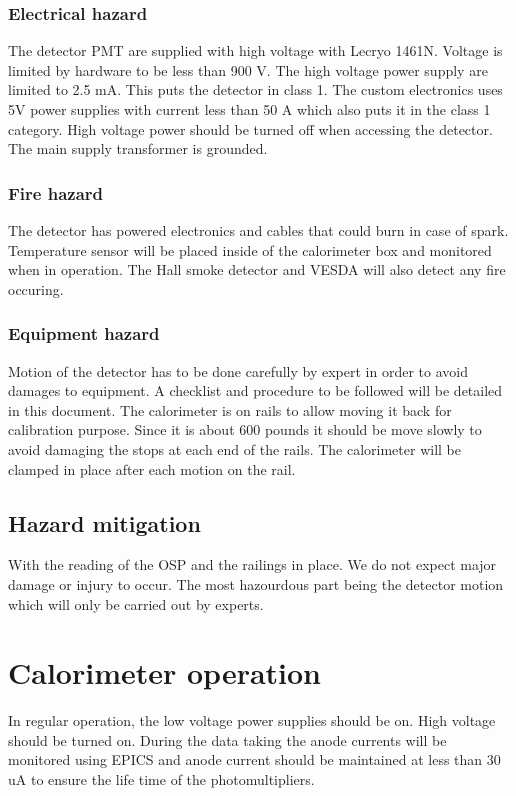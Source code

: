 \documentclass{article}
\begin{document}
\subsubsection{Electrical hazard}
The detector PMT are supplied with high voltage with Lecryo 1461N. Voltage is limited by hardware to be less than 900 V. The high voltage power supply are limited to 2.5 mA. This puts the detector in class 1.
The custom electronics uses 5V power supplies with current less than 50 A which also puts it in the class 1 category. 
High voltage power should be turned off when accessing the detector.
The main supply transformer is grounded.

\subsubsection{Fire hazard}
The detector has powered electronics and cables that could burn in case of spark.
Temperature sensor will be placed inside of the calorimeter box and monitored when in operation. The Hall smoke detector and VESDA will also detect any fire occuring.

\subsubsection{Equipment hazard}
Motion of the detector has to be done carefully by expert in order to avoid damages to equipment. A checklist and procedure to be followed will be detailed in this document.
The calorimeter is on rails to allow moving it back for calibration purpose. Since it is about 600 pounds it should be move slowly to avoid damaging the stops at each end of the rails. The calorimeter will be clamped in place after each motion on the rail.

\subsection{Hazard mitigation}
With the reading of the OSP and the railings in place. We do not expect major damage or injury to occur. The most hazourdous part being the detector motion which will only be carried out by experts.

\section{Calorimeter operation}
In regular operation, the low voltage power supplies should be on.
High voltage should be turned on. During the data taking the anode currents
will be monitored using EPICS and anode current should be maintained at less than 30 uA to ensure the life time of the photomultipliers.
\end{document}
